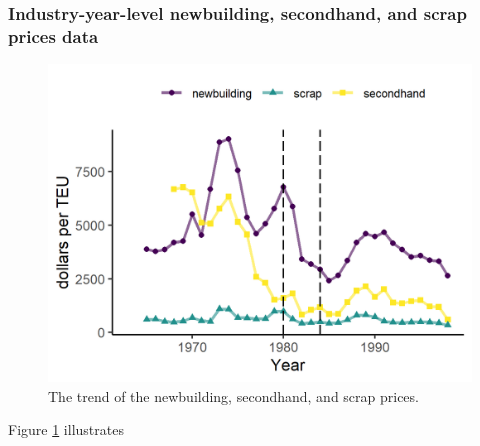 \documentclass[11pt]{article}
\begin{document}
\subsubsection{Industry-year-level newbuilding, secondhand, and scrap prices data}


\begin{figure}[!ht]
\begin{center}
\includegraphics[height = 0.5\textheight]{figuretable/price_newbuilding_secondhand_scrap.png}
\end{center}
\caption{The trend of the newbuilding, secondhand, and scrap prices.}
\label{fg:price_newbuilding_secondhand_scrap}
\end{figure}

Figure \ref{fg:price_newbuilding_secondhand_scrap} illustrates

\end{document}
